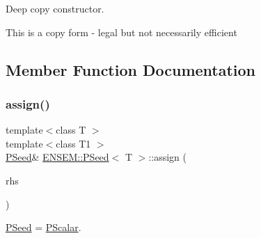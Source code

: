 Deep copy constructor. 

This is a copy form -\/ legal but not necessarily efficient 

\subsection{Member Function Documentation}
\mbox{\label{classENSEM_1_1PSeed_a8d74bd21af23dfb165937c3bb546ea8f}} 
\subsubsection{\texorpdfstring{assign()}{assign()}\hspace{0.1cm}{\footnotesize\ttfamily [1/2]}}
{\footnotesize\ttfamily template$<$class T $>$ \\
template$<$class T1 $>$ \\
\mbox{\hyperlink{classENSEM_1_1PSeed}{P\+Seed}}\& \mbox{\hyperlink{classENSEM_1_1PSeed}{E\+N\+S\+E\+M\+::\+P\+Seed}}$<$ T $>$\+::assign (\begin{DoxyParamCaption}\item[{const \mbox{\hyperlink{classENSEM_1_1PScalar}{P\+Scalar}}$<$ T1 $>$ \&}]{rhs }\end{DoxyParamCaption})\hspace{0.3cm}{\ttfamily [inline]}}



\mbox{\hyperlink{classENSEM_1_1PSeed}{P\+Seed}} = \mbox{\hyperlink{classENSEM_1_1PScalar}{P\+Scalar}}. 

